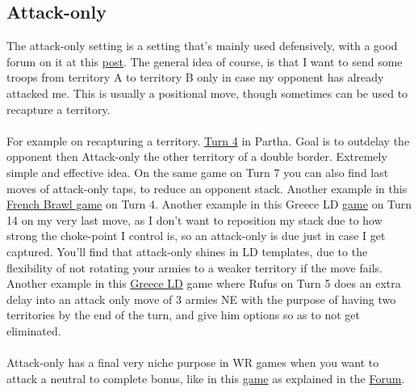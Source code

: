 \subsection{Attack-only}

The attack-only setting is a setting that's mainly used defensively, with a good forum on it at this \href{https://www.warzone.com/Forum/4440-usefulness-attacktransfer-orders?Offset=19}{post}. The general idea of course, is that I want to send some troops from territory A to territory B only in case my opponent has already attacked me. This is usually a positional move, though sometimes can be used to recapture a territory.
\\
\\
For example on recapturing a territory. \href{https://www.warzone.com/MultiPlayer?GameID=41541364}{Turn 4} in Partha. Goal is to outdelay the opponent then Attack-only the other territory of a double border. Extremely simple and effective idea. On the same game on Turn 7 you can also find last moves of attack-only taps, to reduce an opponent stack. Another example in this \href{https://www.warzone.com/MultiPlayer?GameID=40011579}{French Brawl game} on Turn 4. Another example in this Greece LD \href{https://www.warzone.com/MultiPlayer?GameID=39911346}{game} on Turn 14 on my very last move, as I don't want to reposition my stack due to how strong the choke-point I control is, so an attack-only is due just in case I get captured. You'll find that attack-only shines in LD templates, due to the flexibility of not rotating your armies to a weaker territory if the move fails. Another example in this \href{https://www.warzone.com/MultiPlayer?GameID=36677819}{Greece LD} game where Rufus on Turn 5 does an extra delay into an attack only move of 3 armies NE with the purpose of having two territories by the end of the turn, and give him options so as to not get eliminated.
\\
\\
Attack-only has a final very niche purpose in WR games when you want to attack a neutral to complete bonus, like in this \href{https://www.warzone.com/multiplayer?GameID=7926274}{game} as explained in the \href{https://www.warzone.com/Forum/149405-trans-attc-percentage-cards?Offset=0}{Forum}.